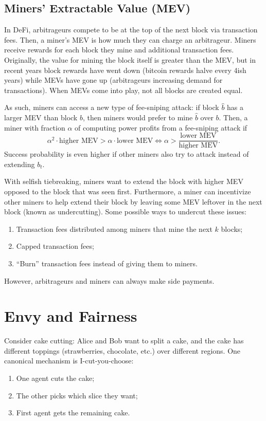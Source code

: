 \documentclass[dvipsnames]{article}
\theoremstyle{definition}
\theoremstyle{remark}
\begin{document}
\subsection{Miners’ Extractable Value (MEV)}
In DeFi, arbitrageurs compete to be at the top of the next block via transaction fees. Then, a miner's MEV is how much they can charge an arbitrageur. Miners receive rewards for each block they mine and additional transaction fees. Originally, the value for mining the block itself is greater than the MEV, but in recent years block rewards have went down (bitcoin rewards halve every 4ish years) while MEVs have gone up (arbitrageurs increasing demand for transactions). When MEVs come into play, not all blocks are created equal.

As such, miners can access a new type of fee-sniping attack: if block $\hat{b}$ has a larger MEV than block $b$, then miners would prefer to mine $\hat{b}$ over $b$. Then, a miner with fraction $\alpha$ of computing power profits from a fee-sniping attack if 
$$\alpha^2 \cdot \text{higher MEV} > \alpha \cdot \text{lower MEV} \iff \alpha > \frac{\text{lower MEV}}{\text{higher MEV}}.$$
Success probability is even higher if other miners also try to attack instead of extending $b_t$.

With selfish tiebreaking, miners want to extend the block with higher MEV opposed to the block that was seen first. Furthermore, a miner can incentivize other miners to help extend their block by leaving some MEV leftover in the next block (known as undercutting). Some possible ways to undercut these issues: 
\begin{enumerate}
	\item Transaction fees distributed among miners that mine the next $k$ blocks;
	\item Capped transaction fees;
	\item ``Burn'' transaction fees instead of giving them to miners.
\end{enumerate}
However, arbitrageurs and miners can always make side payments.

\newpage

\section{Envy and Fairness}

Consider cake cutting: Alice and Bob want to split a cake, and the cake has different toppings (strawberries, chocolate, etc.) over different regions. One canonical mechanism is I-cut-you-choose: 
\begin{enumerate}
	\item One agent cuts the cake;
	\item The other picks which slice they want;
	\item First agent gets the remaining cake.
\end{enumerate}
\end{document}
